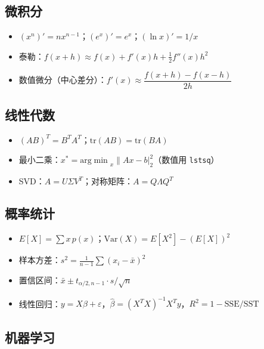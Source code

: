 \subsection{微积分}\label{ux5faeux79efux5206}

\begin{itemize}
\tightlist
\item
  \((x^n)'=nx^{n-1}\)；\((e^x)'=e^x\)；\((\ln x)'=1/x\)
\item
  泰勒：\(f(x+h)\approx f(x)+f'(x)h+\tfrac12 f''(x)h^2\)
\item
  数值微分（中心差分）：\(f'(x)\approx\dfrac{f(x+h)-f(x-h)}{2h}\)
\end{itemize}

\subsection{线性代数}\label{ux7ebfux6027ux4ee3ux6570}

\begin{itemize}
\tightlist
\item
  \((AB)^T=B^TA^T\)；\(\mathrm{tr}(AB)=\mathrm{tr}(BA)\)
\item
  最小二乘：\(x^{*}=\mathrm{arg\min}_x\|Ax-b|_2^2\)（数值用
  \texttt{lstsq}）
\item
  SVD：\(A=U\Sigma V^T\)；对称矩阵：\(A=Q\Lambda Q^T\)
\end{itemize}

\subsection{概率统计}\label{ux6982ux7387ux7edfux8ba1}

\begin{itemize}
\tightlist
\item
  \(E[X]=\sum x\,p(x)\)；\(\mathrm{Var}(X)=E[X^2]-(E[X])^2\)
\item
  样本方差：\(s^2=\frac{1}{n-1}\sum(x_i-\bar{x})^2\)
\item
  置信区间：\(\bar{x}\pm t_{\alpha/2,n-1}\cdot s/\sqrt n\)
\item
  线性回归：\(y=X\beta+\varepsilon\)，\(\hat{\beta}=(X^TX)^{-1}X^Ty\)，\(R^2=1-\mathrm{SSE}/\mathrm{SST}\)
\end{itemize}

\subsection{机器学习}\label{ux673aux5668ux5b66ux4e60}

